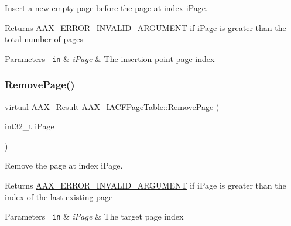 Insert a new empty page before the page at index {\ttfamily i\+Page}. 

\begin{DoxyReturn}{Returns}
\mbox{\hyperlink{a00494_a5f8c7439f3a706c4f8315a9609811937a7d27a3bd88231e331c98d85f5b10e2eb}{A\+A\+X\+\_\+\+E\+R\+R\+O\+R\+\_\+\+I\+N\+V\+A\+L\+I\+D\+\_\+\+A\+R\+G\+U\+M\+E\+NT}} if {\ttfamily i\+Page} is greater than the total number of pages
\end{DoxyReturn}

\begin{DoxyParams}[1]{Parameters}
\mbox{\texttt{ in}}  & {\em i\+Page} & The insertion point page index \\
\hline
\end{DoxyParams}
\mbox{\label{a01725_a111b8371211623bf0c73e6fe8e77c82c}} 
\subsubsection{\texorpdfstring{RemovePage()}{RemovePage()}}
{\footnotesize\ttfamily virtual \mbox{\hyperlink{a00392_a4d8f69a697df7f70c3a8e9b8ee130d2f}{A\+A\+X\+\_\+\+Result}} A\+A\+X\+\_\+\+I\+A\+C\+F\+Page\+Table\+::\+Remove\+Page (\begin{DoxyParamCaption}\item[{int32\+\_\+t}]{i\+Page }\end{DoxyParamCaption})\hspace{0.3cm}{\ttfamily [pure virtual]}}



Remove the page at index {\ttfamily i\+Page}. 

\begin{DoxyReturn}{Returns}
\mbox{\hyperlink{a00494_a5f8c7439f3a706c4f8315a9609811937a7d27a3bd88231e331c98d85f5b10e2eb}{A\+A\+X\+\_\+\+E\+R\+R\+O\+R\+\_\+\+I\+N\+V\+A\+L\+I\+D\+\_\+\+A\+R\+G\+U\+M\+E\+NT}} if {\ttfamily i\+Page} is greater than the index of the last existing page
\end{DoxyReturn}

\begin{DoxyParams}[1]{Parameters}
\mbox{\texttt{ in}}  & {\em i\+Page} & The target page index \\
\hline
\end{DoxyParams}
\mbox{\label{a01725_a5fe90fe5ca247a2111ff8892861daefb}} 
